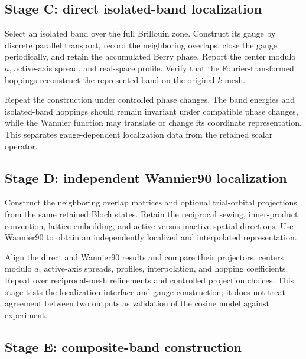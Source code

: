 \subsection*{Stage C: direct isolated-band localization}

Select an isolated band over the full Brillouin zone. Construct its gauge by
discrete parallel transport, record the neighboring overlaps, close the gauge
periodically, and retain the accumulated Berry phase. Report the center modulo
$a$, active-axis spread, and real-space profile. Verify that the
Fourier-transformed hoppings reconstruct the represented band on the original
$k$ mesh.

Repeat the construction under controlled phase changes. The band energies and
isolated-band hoppings should remain invariant under compatible phase changes,
while the Wannier function may translate or change its coordinate
representation. This separates gauge-dependent localization data from the
retained scalar operator.

\subsection*{Stage D: independent Wannier90 localization}

Construct the neighboring overlap matrices and optional trial-orbital
projections from the same retained Bloch states. Retain the reciprocal sewing,
inner-product convention, lattice embedding, and active versus inactive
spatial directions. Use Wannier90 to obtain an independently localized and
interpolated representation.

Align the direct and Wannier90 results and compare their projectors, centers
modulo $a$, active-axis spreads, profiles, interpolation, and hopping
coefficients. Repeat over reciprocal-mesh refinements and controlled projection
choices. This stage tests the localization interface and gauge construction; it
does not treat agreement between two outputs as validation of the cosine model
against experiment.

\subsection*{Stage E: composite-band construction}

